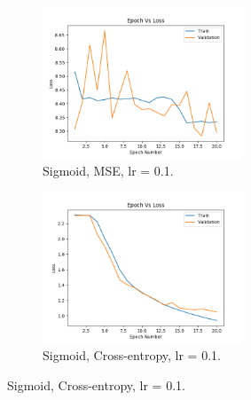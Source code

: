\documentclass[12pt]{article}
\begin{document}
		
			\begin{figure}
				\centering
				\begin{framed}
				\begin{subfigure}{5.5cm}
					\centering
					\includegraphics[width=6cm]{../Images/Epoch_VS_Loss/Sigmoid_MSE_01.png}
					\captionsetup{justification=centering,margin=1cm}
					\caption{Sigmoid, MSE, lr = 0.1.}
					\label{fig:sub1}
				\end{subfigure}%
				\begin{subfigure}{5.5cm}
					\centering
					\includegraphics[width=6cm]{../Images/Epoch_VS_Loss/Sigmoid_cross-entropy_01.png}
					\captionsetup{justification=centering,margin=0.8cm}
					\caption{Sigmoid, Cross-entropy, lr = 0.1.}
					\label{fig:sub2}
				\end{subfigure}%
			

\end{framed}
\end{figure}
\end{document}
